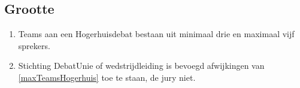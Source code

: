 \subsection{Grootte}
\begin{enumerate}
\item \label{maxTeamsHogerhuis} Teams aan een Hogerhuisdebat bestaan uit minimaal drie en maximaal vijf sprekers.
\item Stichting DebatUnie of wedstrijdleiding is bevoegd afwijkingen van \ref{maxTeamsHogerhuis} toe te staan, de jury niet.
\end{enumerate}
